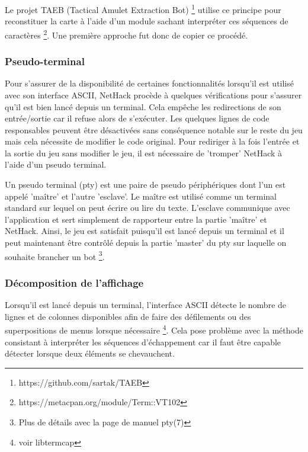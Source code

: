 \documentclass[a4paper,12pt]{article}
\begin{document}
Le projet TAEB (Tactical Amulet Extraction Bot)
\footnote{https://github.com/sartak/TAEB} utilise ce principe pour
reconstituer la carte à l'aide d'un module sachant interpréter ces séquences
de caractères \footnote{https://metacpan.org/module/Term::VT102}. Une première
approche fut donc de copier ce procédé.


\subsubsection*{Pseudo-terminal}

Pour s'assurer de la disponibilité de certaines fonctionnalités lorsqu'il est
utilisé avec son interface ASCII, NetHack procède à quelques vérifications
pour s'assurer qu'il est bien lancé depuis un terminal. Cela empêche les
redirections de son entrée/sortie car il refuse alors de s'exécuter. Les
quelques lignes de code responsables peuvent être désactivées sans conséquence
notable sur le reste du jeu mais cela nécessite de modifier le code original.
Pour rediriger à la fois l'entrée et la sortie du jeu sans modifier le jeu, il
est nécessaire de 'tromper' NetHack à l'aide d'un pseudo terminal.

Un pseudo terminal (pty) est une paire de pseudo périphériques dont l'un est
appelé 'maître' et l'autre 'esclave'. Le maître est utilisé comme un terminal
standard sur lequel on peut écrire ou lire du texte. L'esclave communique avec
l'application et sert simplement de rapporteur entre la partie 'maître' et
NetHack. Ainsi, le jeu est satisfait puisqu'il est lancé depuis un terminal et
il peut maintenant être contrôlé depuis la partie 'master' du pty sur laquelle
on souhaite brancher un bot \footnote{Plus de détails avec la page de manuel
pty(7)}.


\subsubsection*{Décomposition de l'affichage}

Lorsqu'il est lancé depuis un terminal, l'interface ASCII détecte le nombre de
lignes et de colonnes disponibles afin de faire des défilements ou des
superpositions de menus lorsque nécessaire \footnote{voir libtermcap}. Cela
pose problème avec la méthode consistant à interpréter les séquences
d'échappement car il faut être capable détecter lorsque deux éléments se
chevauchent.
\end{document}
